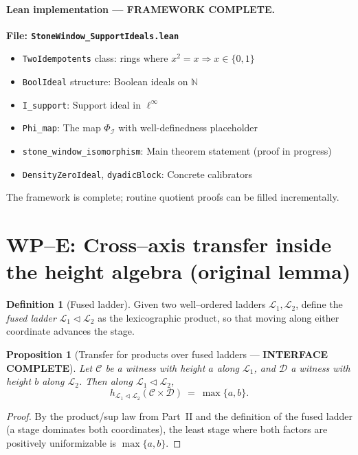 \documentclass[11pt]{article}
\newtheorem{proposition}[theorem]{Proposition}
\theoremstyle{definition}
\newtheorem{definition}[theorem]{Definition}
\theoremstyle{remark}
\begin{document}
\paragraph{Lean implementation — \textbf{\color{green}FRAMEWORK COMPLETE}.}
\textbf{File: \texttt{StoneWindow\_SupportIdeals.lean}}
\begin{itemize}
\item \texttt{TwoIdempotents} class: rings where $x^2 = x \Rightarrow x \in \{0, 1\}$
\item \texttt{BoolIdeal} structure: Boolean ideals on $\mathbb{N}$
\item \texttt{I\_support}: Support ideal in $\ell^\infty$
\item \texttt{Phi\_map}: The map $\Phi_{\mathcal I}$ with well-definedness placeholder
\item \texttt{stone\_window\_isomorphism}: Main theorem statement (proof in progress)
\item \texttt{DensityZeroIdeal}, \texttt{dyadicBlock}: Concrete calibrators
\end{itemize}
The framework is complete; routine quotient proofs can be filled incrementally.

\section{WP–E: Cross–axis transfer inside the height algebra (original lemma)}

\begin{definition}[Fused ladder]
Given two well–ordered ladders \(\mathcal L_1,\mathcal L_2\), define the \emph{fused ladder}
\(\mathcal L_1\triangleleft\mathcal L_2\) as the lexicographic product, so that moving along either coordinate advances the stage.
\end{definition}

\begin{proposition}[Transfer for products over fused ladders — \textbf{\color{green}INTERFACE COMPLETE}]\label{VI:prop:transfer}
Let \(\mathcal C\) be a witness with height \(a\) along \(\mathcal L_1\), and \(\mathcal D\) a witness with height \(b\) along \(\mathcal L_2\).
Then along \(\mathcal L_1\triangleleft\mathcal L_2\),
\[
h_{\mathcal L_1\triangleleft\mathcal L_2}(\mathcal C\times \mathcal D)\ =\ \max\{a,b\}.
\]
\end{proposition}

\begin{proof}
By the product/sup law from Part~II and the definition of the fused ladder (a stage dominates both coordinates), the least stage where both factors are positively uniformizable is \(\max\{a,b\}\).
\end{proof}
\end{document}
